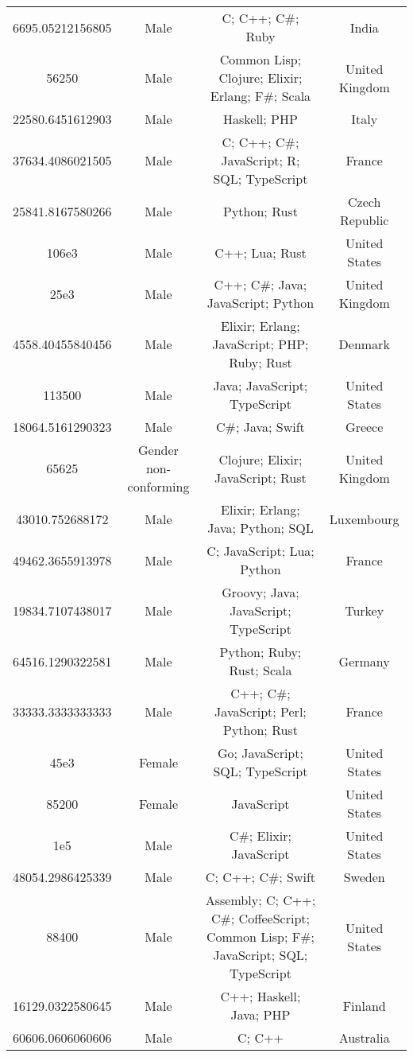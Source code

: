 \begin{center}
\begin{tabular}{ |c|c|c|c| }
6695.05212156805  &  Male  &  C; C++; C\#; Ruby  &  India  \\ 
56250  &  Male  &  Common Lisp; Clojure; Elixir; Erlang; F\#; Scala  &  United Kingdom  \\ 
22580.6451612903  &  Male  &  Haskell; PHP  &  Italy  \\ 
37634.4086021505  &  Male  &  C; C++; C\#; JavaScript; R; SQL; TypeScript  &  France  \\ 
25841.8167580266  &  Male  &  Python; Rust  &  Czech Republic  \\ 
106e3  &  Male  &  C++; Lua; Rust  &  United States  \\ 
25e3  &  Male  &  C++; C\#; Java; JavaScript; Python  &  United Kingdom  \\ 
4558.40455840456  &  Male  &  Elixir; Erlang; JavaScript; PHP; Ruby; Rust  &  Denmark  \\ 
113500  &  Male  &  Java; JavaScript; TypeScript  &  United States  \\ 
18064.5161290323  &  Male  &  C\#; Java; Swift  &  Greece  \\ 
65625  &  Gender non-conforming  &  Clojure; Elixir; JavaScript; Rust  &  United Kingdom  \\ 
43010.752688172  &  Male  &  Elixir; Erlang; Java; Python; SQL  &  Luxembourg  \\ 
49462.3655913978  &  Male  &  C; JavaScript; Lua; Python  &  France  \\ 
19834.7107438017  &  Male  &  Groovy; Java; JavaScript; TypeScript  &  Turkey  \\ 
64516.1290322581  &  Male  &  Python; Ruby; Rust; Scala  &  Germany  \\ 
33333.3333333333  &  Male  &  C++; C\#; JavaScript; Perl; Python; Rust  &  France  \\ 
45e3  &  Female  &  Go; JavaScript; SQL; TypeScript  &  United States  \\ 
85200  &  Female  &  JavaScript  &  United States  \\ 
1e5  &  Male  &  C\#; Elixir; JavaScript  &  United States  \\ 
48054.2986425339  &  Male  &  C; C++; C\#; Swift  &  Sweden  \\ 
88400  &  Male  &  Assembly; C; C++; C\#; CoffeeScript; Common Lisp; F\#; JavaScript; SQL; TypeScript  &  United States  \\ 
16129.0322580645  &  Male  &  C++; Haskell; Java; PHP  &  Finland  \\ 
60606.0606060606  &  Male  &  C; C++  &  Australia  \\ 

\end{tabular}
\end{center}

